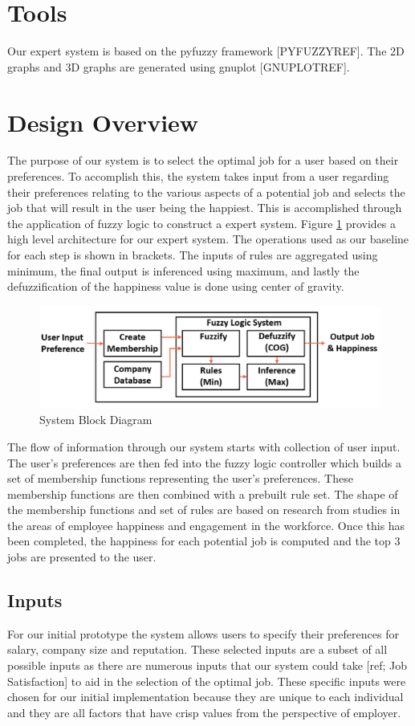 \documentclass[12pt,fleqn,reqno,letterpaper]{article}
\begin{document}
\section{Tools}
Our expert system is based on the pyfuzzy framework [PYFUZZYREF]. The 2D graphs and 3D graphs are generated using gnuplot [GNUPLOTREF].

\section{Design Overview}
The purpose of our system is to select the optimal job for a user based on their preferences. To accomplish this, the system takes input from a user regarding their preferences relating to the various aspects of a potential job and selects the job that will result in the user being the happiest. This is accomplished through the application of fuzzy logic to construct a expert system. Figure \ref{fig:block-diagram} provides a high level architecture for our expert system. The operations used as our baseline for each step is shown in brackets. The inputs of rules are aggregated using minimum, the final output is inferenced using maximum, and lastly the defuzzification of the happiness value is done using center of gravity.
\begin{figure}[ht]
  \centering
  \includegraphics[scale=0.3,natwidth=1166,natheight=352]{fig/BLOCK_DIAGRAM.png}
  \caption{System Block Diagram}
  \label{fig:block-diagram}
\end{figure}
The flow of information through our system starts with collection of user input. The user’s preferences are then fed into the fuzzy logic controller which builds a set of membership functions representing the user’s preferences. These membership functions are then combined with a prebuilt rule set. The shape of the membership functions and set of rules are based on research from studies in the areas of employee happiness and engagement in the workforce. Once this has been completed, the happiness for each potential job is computed and the top 3 jobs are presented to the user.

\subsection{Inputs}
For our initial prototype the system allows users to specify their preferences for salary, company size and reputation. These selected inputs are a subset of all possible inputs as there are numerous inputs that our system could take [ref; Job Satisfaction] to aid in the selection of the optimal job. These specific inputs were chosen for our initial implementation because they are unique to each individual and they are all factors that have crisp values from the perspective of employer.
\end{document}
